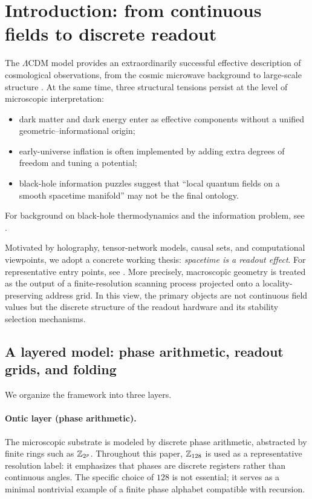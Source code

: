 
\section{Introduction: from continuous fields to discrete readout}
\label{sec:introduction}

The $\Lambda$CDM model provides an extraordinarily successful effective description of cosmological observations, from the cosmic microwave background to large-scale structure \cite{Planck2018CosmoParams}.
At the same time, three structural tensions persist at the level of microscopic interpretation:
\begin{itemize}
\item dark matter and dark energy enter as effective components without a unified geometric--informational origin;
\item early-universe inflation is often implemented by adding extra degrees of freedom and tuning a potential;
\item black-hole information puzzles suggest that ``local quantum fields on a smooth spacetime manifold'' may not be the final ontology.
\end{itemize}
For background on black-hole thermodynamics and the information problem, see \cite{Bekenstein1973,Hawking1975,Page1993}.

Motivated by holography, tensor-network models, causal sets, and computational viewpoints, we adopt a concrete working thesis:
\emph{spacetime is a readout effect}.
For representative entry points, see \cite{tHooft1993,Susskind1995,Bousso2002,Vidal2007MERA,Swingle2012MERA,BombelliLeeMeyerSorkin1987}.
More precisely, macroscopic geometry is treated as the output of a finite-resolution scanning process projected onto a locality-preserving address grid.
In this view, the primary objects are not continuous field values but the discrete structure of the readout hardware and its stability selection mechanisms.

\subsection{A layered model: phase arithmetic, readout grids, and folding}
\label{subsec:intro_layered}

We organize the framework into three layers.

\paragraph{Ontic layer (phase arithmetic).}
The microscopic substrate is modeled by discrete phase arithmetic, abstracted by finite rings such as $\mathbb{Z}_{2^p}$.
Throughout this paper, $\mathbb{Z}_{128}$ is used as a representative resolution label: it emphasizes that phases are discrete registers rather than continuous angles.
The specific choice of $128$ is not essential; it serves as a minimal nontrivial example of a finite phase alphabet compatible with recursion.

